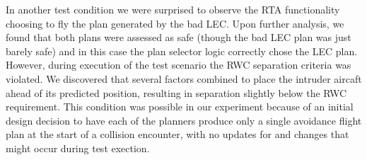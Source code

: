 In another test condition we were surprised to observe the RTA functionality choosing to fly the plan generated by the bad LEC.  Upon further analysis, we found that both plans were assessed as safe (though the bad LEC plan was just barely safe) and in this case the plan selector logic correctly chose the LEC plan.  However, during execution of the test scenario the RWC separation criteria was violated.  We discovered that several factors combined to place the intruder aircaft ahead of its predicted position, resulting in separation slightly below the RWC requirement.  This condition was possible in our experiment because of an initial design decision to have each of the planners produce only a single avoidance flight plan at the start of a collision encounter, with no updates for and changes that might occur during test exection.  


